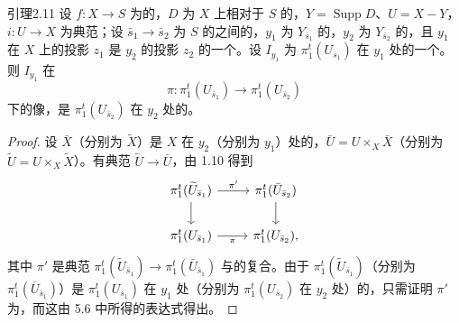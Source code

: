 \begin{SGAresult}{引理}{2.11}
设 $f:X\to S$ 为的，$D$ 为 $X$ 上相对于 $S$ 的，$Y=\operatorname{Supp}D$、$U=X-Y$，$i:U\to X$ 为典范；设 $\bar s_1\to\bar s_2$ 为 $S$ 的之间的，$y_1$ 为 $Y_{\bar s_1}$ 的，$y_2$ 为 $Y_{\bar s_2}$ 的，且 $y_1$ 在 $X$ 上的投影 $z_1$ 是 $y_2$ 的投影 $z_2$ 的一个。设 $I_{y_1}$ 为 $\pi_1^t(U_{\bar s_1})$ 在 $y_1$ 处的一个。则 $I_{y_1}$ 在
\[\pi:\pi_1^t(U_{\bar s_1})\longrightarrow\pi_1^t(U_{\bar s_2})\]
下的像，是 $\pi_1^t(U_{\bar s_2})$ 在 $y_2$ 处的。
\end{SGAresult}
\begin{proof}
设 $\bar X$（分别为 $\widetilde X$）是 $X$ 在 $y_2$（分别为 $y_1$）处的，$\bar U=U\times_X\bar X$（分别为 $\widetilde U=U\times_X\widetilde X$）。有典范 $\widetilde U\to\bar U$，由 1.10 得到
\[
\begin{tikzcd}
\pi_1^t(\widetilde U_{\bar s_1})\arrow[r,"\pi'"]\arrow[d]&\pi_1^t(\bar U_{\bar s_2})\arrow[d]\\
\pi_1^t(U_{\bar s_1})\arrow[r,"\pi"']&\pi_1^t(U_{\bar s_2}),
\end{tikzcd}
\]
其中 $\pi'$ 是典范 $\pi_1^t(\widetilde U_{\bar s_1})\to\pi_1^t(\bar U_{\bar s_1})$ 与的复合。由于 $\pi_1^t(\widetilde U_{\bar s_1})$（分别为 $\pi_1^t(\bar U_{\bar s_1})$）是 $\pi_1^t(U_{\bar s_1})$ 在 $y_1$ 处（分别为 $\pi_1^t(U_{\bar s_2})$ 在 $y_2$ 处）的，只需证明 $\pi'$ 为，而这由 5.6 中所得的表达式得出。
\end{proof}

